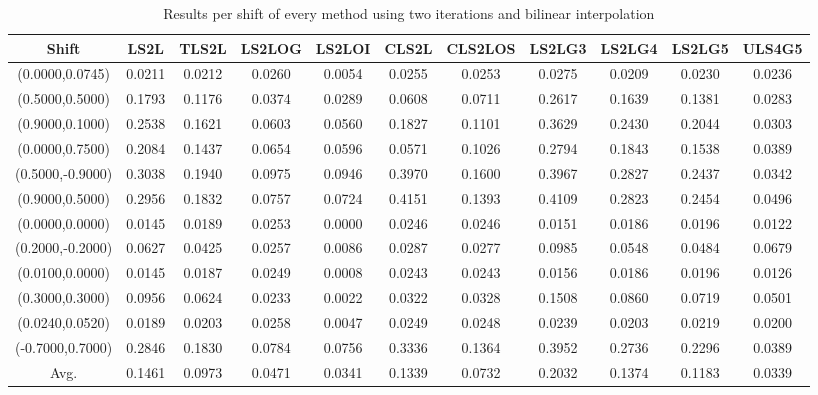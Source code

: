 \begin{table}[ht!]
\centering
\begin{tabular}{c|c|c|c|c|c|c|c|c|c|c}
Shift & \scriptsize{LS2L} & \scriptsize{TLS2L} & \scriptsize{LS2LOG} & \scriptsize{LS2LOI} & \scriptsize{CLS2L} & \scriptsize{CLS2LOS} & \scriptsize{LS2LG3} & \scriptsize{LS2LG4} & \scriptsize{LS2LG5} & \scriptsize{ULS4G5}\\ \hline 
(0.0000,0.0745) & 0.0211 & 0.0212 & 0.0260 & 0.0054 & 0.0255 & 0.0253 & 0.0275 & 0.0209 & 0.0230 & 0.0236 \\ \hline
(0.5000,0.5000) & 0.1793 & 0.1176 & 0.0374 & 0.0289 & 0.0608 & 0.0711 & 0.2617 & 0.1639 & 0.1381 & 0.0283 \\ \hline
(0.9000,0.1000) & 0.2538 & 0.1621 & 0.0603 & 0.0560 & 0.1827 & 0.1101 & 0.3629 & 0.2430 & 0.2044 & 0.0303 \\ \hline
(0.0000,0.7500) & 0.2084 & 0.1437 & 0.0654 & 0.0596 & 0.0571 & 0.1026 & 0.2794 & 0.1843 & 0.1538 & 0.0389 \\ \hline
(0.5000,-0.9000) & 0.3038 & 0.1940 & 0.0975 & 0.0946 & 0.3970 & 0.1600 & 0.3967 & 0.2827 & 0.2437 & 0.0342 \\ \hline
(0.9000,0.5000) & 0.2956 & 0.1832 & 0.0757 & 0.0724 & 0.4151 & 0.1393 & 0.4109 & 0.2823 & 0.2454 & 0.0496 \\ \hline
(0.0000,0.0000) & 0.0145 & 0.0189 & 0.0253 & 0.0000 & 0.0246 & 0.0246 & 0.0151 & 0.0186 & 0.0196 & 0.0122 \\ \hline
(0.2000,-0.2000) & 0.0627 & 0.0425 & 0.0257 & 0.0086 & 0.0287 & 0.0277 & 0.0985 & 0.0548 & 0.0484 & 0.0679 \\ \hline
(0.0100,0.0000) & 0.0145 & 0.0187 & 0.0249 & 0.0008 & 0.0243 & 0.0243 & 0.0156 & 0.0186 & 0.0196 & 0.0126 \\ \hline
(0.3000,0.3000) & 0.0956 & 0.0624 & 0.0233 & 0.0022 & 0.0322 & 0.0328 & 0.1508 & 0.0860 & 0.0719 & 0.0501 \\ \hline
(0.0240,0.0520) & 0.0189 & 0.0203 & 0.0258 & 0.0047 & 0.0249 & 0.0248 & 0.0239 & 0.0203 & 0.0219 & 0.0200 \\ \hline
(-0.7000,0.7000) & 0.2846 & 0.1830 & 0.0784 & 0.0756 & 0.3336 & 0.1364 & 0.3952 & 0.2736 & 0.2296 & 0.0389 \\ \hline
Avg.  & 0.1461 & 0.0973 & 0.0471 & 0.0341 & 0.1339 & 0.0732 & 0.2032 & 0.1374 & 0.1183 & 0.0339 \\ \hline
\end{tabular}
\caption{Results per shift of every method using two iterations and bilinear interpolation}
\label{tab:2itLperShift}
\end{table}


